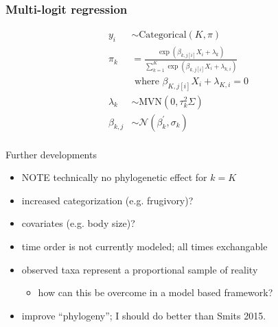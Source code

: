 \documentclass{beamer}
\begin{document}
\begin{frame}
  \frametitle{Multi-logit regression}
  \begin{equation*}
    \begin{aligned}
      y_{i} &\sim \mathrm{Categorical}(K, \pi) \\
      \pi_{k} &= \frac{\exp(\beta_{k, j[i]} X_{i} + \lambda_{k})}{\sum_{k = 1}^{K} \exp(\beta_{k, j[i]} X_{i} + \lambda_{k, i})} \\ 
      &\text{ where } \beta_{K, j[i]} X_{i} + \lambda_{K, i} = 0 \\
      \lambda_{k} &\sim \mathrm{MVN}(0, \tau_{k}^{2}\Sigma) \\
      \beta_{k, j} &\sim \mathcal{N}(\beta_{k}^{\prime}, \sigma_{k}) \\
    \end{aligned}
  \end{equation*}
\end{frame}

\begin{frame}
  \begin{block}{Further developments}
    \begin{itemize}
      \item \uppercase{\alert{note}} technically no phylogenetic effect for \(k = K\)
      \item increased categorization (e.g. frugivory)?
      \item covariates (e.g. body size)?
      \item time order is not currently modeled; all times exchangable
      \item observed taxa represent a proportional sample of reality
        \begin{itemize}
          \item how can this be overcome in a \alert{model based} framework?
        \end{itemize}
      \item improve ``phylogeny''; I should do better than Smits 2015.
    \end{itemize}
  \end{block}
\end{frame}
\end{document}
